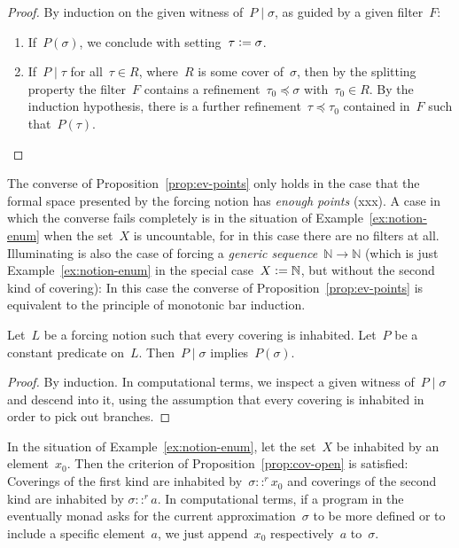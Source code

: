 \documentclass[envcountsect,envcountsame,runningheads]{llncs}
\newcommand{\NN}{\mathbb{N}}
\newcommand{\defeq}{\vcentcolon=}
\renewcommand{\_}{\mathpunct{.}\,}
\begin{document}
\begin{proof}By induction on the given witness of~$P \mid \sigma$, as guided by
a given filter~$F$:
\begin{enumerate}
\item If~$P(\sigma)$, we conclude with setting~$\tau \defeq \sigma$.
\item If~$P \mid \tau$ for all~$\tau \in R$, where~$R$ is some cover
of~$\sigma$, then by the splitting property the filter~$F$ contains a refinement~$\tau_0
\preceq \sigma$ with~$\tau_0 \in R$. By the induction hypothesis, there is a
further refinement~$\tau \preceq \tau_0$ contained in~$F$ such that~$P(\tau)$.
\end{enumerate}
\end{proof}

The converse of Proposition~\ref{prop:ev-points} only holds in the case that
the formal space presented by the forcing notion has \emph{enough points}
(xxx). A case in which the converse fails completely is in the situation of
Example~\ref{ex:notion-enum} when the set~$X$ is uncountable, for in this case
there are no filters at all. Illuminating is also the case of forcing a
\emph{generic sequence}~$\NN \to \NN$ (which is just
Example~\ref{ex:notion-enum} in the special case~$X \defeq \NN$, but without
the second kind of covering): In this case the converse of
Proposition~\ref{prop:ev-points} is equivalent to the principle of monotonic
bar induction.

\begin{lemma}\label{prop:cov-open}
Let~$L$ be a forcing notion such that every covering is inhabited. Let~$P$ be a
constant predicate on~$L$. Then~$P \mid \sigma$ implies~$P(\sigma)$.
\end{lemma}

\begin{proof}By induction. In computational terms, we inspect a given witness
of~$P \mid \sigma$ and descend into it, using the assumption that every
covering is inhabited in order to pick out branches.
\end{proof}

\begin{example}In the situation of Example~\ref{ex:notion-enum}, let the
set~$X$ be inhabited by an element~$x_0$. Then the criterion of
Proposition~\ref{prop:cov-open} is satisfied: Coverings of the first kind are
inhabited by~$\sigma ::^r x_0$ and coverings of the second kind are inhabited
by $\sigma ::^r a$. In computational terms, if a program in the eventually
monad asks for the current approximation~$\sigma$ to be more defined or to include a
specific element~$a$, we just append~$x_0$ respectively~$a$ to~$\sigma$.
\end{example}
\end{document}
